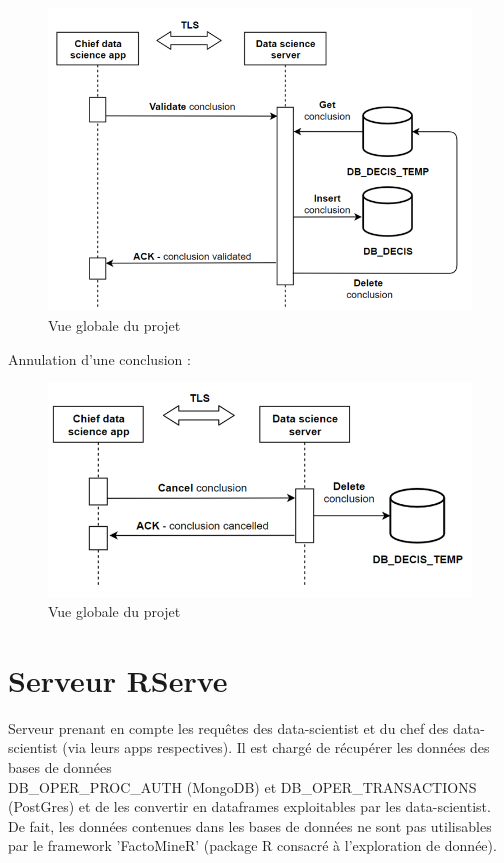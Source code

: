 \begin{figure}[H]
    \centering
    \includegraphics[width=\textwidth]{./img/thibault-DataScientistApp_3.png}
    \caption{Vue globale du projet}
    \label{fig:thibault-chief-app-validate}
\end{figure}

Annulation d'une conclusion :

\begin{figure}[H]
    \centering
    \includegraphics[width=\textwidth]{./img/thibault-DataScientistApp_4.png}
    \caption{Vue globale du projet}
    \label{fig:thibault-chief-app-cancel}
\end{figure}

\section{Serveur RServe}

Serveur prenant en compte les requêtes des data-scientist et du chef des data-scientist (via leurs apps respectives). Il est chargé de récupérer les données des bases de données \\ DB\_OPER\_PROC\_AUTH (MongoDB) et DB\_OPER\_TRANSACTIONS (PostGres) et de les convertir en dataframes exploitables par les data-scientist. De fait, les données contenues dans les bases de données ne sont pas utilisables par le framework 'FactoMineR' (package R consacré à l'exploration de donnée).

